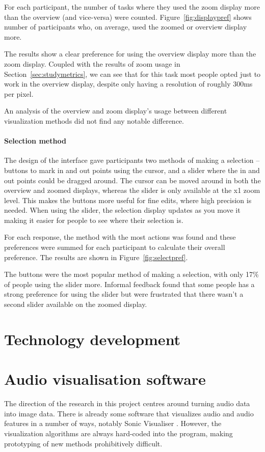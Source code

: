 For each participant, the number of tasks where they used the zoom display more
than the overview (and vice-versa) were counted. Figure~\ref{fig:displaypref}
shows number of participants who, on average, used the zoomed or overview
display more.

The results show a clear preference for using the overview display more than
the zoom display. Coupled with the results of zoom usage in
Section~\ref{sec:studymetrics}, we can see that for this task most people opted
just to work in the overview display, despite only having a resolution of
roughly 300ms per pixel.

An analysis of the overview and zoom display's usage between different
visualization methods did not find any notable difference.

\paragraph{Selection method}
The design of the interface gave participants two methods of making a selection
-- buttons to mark in and out points using the cursor, and a slider where the
in and out points could be dragged around. The cursor can be moved around in
both the overview and zoomed displays, whereas the slider is only available at
the x1 zoom level. This makes the buttons more useful for fine edits, where
high precision is needed. When using the slider, the selection display updates
as you move it making it easier for people to see where their selection is.

For each response, the method with the most actions was found and these
preferences were summed for each participant to calculate their overall
preference. The results are shown in Figure~\ref{fig:selectpref}.

The buttons were the most popular method of making a selection, with only 17\%
of people using the slider more. Informal feedback found that some people has a
strong preference for using the slider but were frustrated that there wasn't a
second slider available on the zoomed display.

\section{Technology development}\label{sec:tech}

\section{Audio visualisation software}\label{sec:vis}
The direction of the research in this project centres around turning audio
data into image data. There is already some software that visualizes audio and
audio features in a number of ways, notably Sonic Visualiser \citep{Cannam2010}.
However, the visualization algorithms are always hard-coded into the program,
making prototyping of new methods prohibitively difficult.

